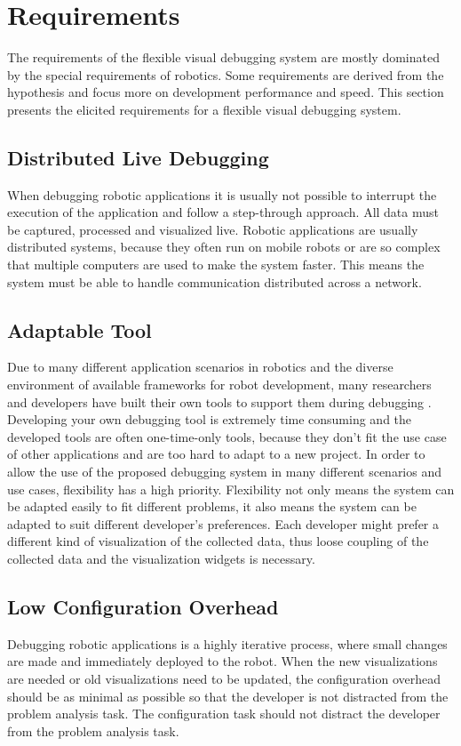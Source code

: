 \section{Requirements}
\label{requirements}
The requirements of the flexible visual debugging system are mostly dominated by the special requirements of robotics. Some requirements are derived from the hypothesis and focus more on development performance and speed. This section presents the elicited requirements for a flexible visual debugging system.

\subsection{Distributed Live Debugging}
When debugging robotic applications it is usually not possible to interrupt the execution of the application and follow a step-through approach. All data must be captured, processed and visualized live. Robotic applications are usually distributed systems, because they often run on mobile robots or are so complex that multiple computers are used to make the system faster. This means the system must be able to handle communication distributed across a network.

\subsection{Adaptable Tool}
Due to many different application scenarios in robotics and the diverse environment of available frameworks for robot development, many researchers and developers have built their own tools to support them during debugging \cite{Collett2010}. Developing your own debugging tool is extremely time consuming and the developed tools are often one-time-only tools, because they don't fit the use case of other applications and are too hard to adapt to a new project.
In order to allow the use of the proposed debugging system in many different scenarios and use cases, flexibility has a high priority. Flexibility not only means the system can be adapted easily to fit different problems, it also means the system can be adapted to suit different developer's preferences. Each developer might prefer a different kind of visualization of the collected data, thus loose coupling of the collected data and the visualization widgets is necessary.

\subsection{Low Configuration Overhead}
Debugging robotic applications is a highly iterative process, where small changes are made and immediately deployed to the robot. When the new visualizations are needed or old visualizations need to be updated, the configuration overhead should be as minimal as possible so that the developer is not distracted from the problem analysis task. The configuration task should not distract the developer from the problem analysis task.

